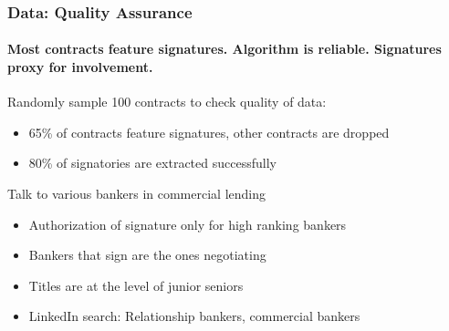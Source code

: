 \documentclass[]{beamer}
\newcommand{\backupbegin}{
	\newcounter{finalframe}
	\setcounter{finalframe}{\value{framenumber}}
}
\begin{document}
\begin{frame}[t]
{   %
   
   \appendix
   \backupbegin
   
   
   \begin{frame}[c]
   \centering
   \begin{huge}
   	\bigskip
   	Appendix
   \end{huge}
\end{frame} 
% 
% 


\begin{frame}[label=Data_assurance]
\frametitle{Data: Quality Assurance}
\framesubtitle{Most contracts feature signatures. Algorithm is reliable. Signatures proxy for involvement.}

Randomly sample 100 contracts to check quality of data:
\begin{itemize}
\item 65\% of contracts feature signatures, other contracts are dropped
\item 80\% of signatories are extracted successfully
\end{itemize}

Talk to various bankers in commercial lending
\begin{itemize}
\item Authorization of signature only for high ranking bankers
\item Bankers that sign are the ones negotiating
\item Titles are at the level of junior seniors
\item LinkedIn search: Relationship bankers, commercial bankers			
\end{itemize}

\begin{center}
\vspace{-0.5em}
\hyperlink{Data_I}{}
\end{center}		


\end{frame}
\end{document}
